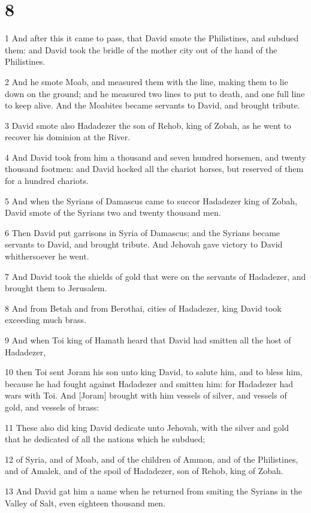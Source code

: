 \chapter{8}

\par 1 And after this it came to pass, that David smote the Philistines, and subdued them: and David took the bridle of the mother city out of the hand of the Philistines.
\par 2 And he smote Moab, and measured them with the line, making them to lie down on the ground; and he measured two lines to put to death, and one full line to keep alive. And the Moabites became servants to David, and brought tribute.
\par 3 David smote also Hadadezer the son of Rehob, king of Zobah, as he went to recover his dominion at the River.
\par 4 And David took from him a thousand and seven hundred horsemen, and twenty thousand footmen: and David hocked all the chariot horses, but reserved of them for a hundred chariots.
\par 5 And when the Syrians of Damascus came to succor Hadadezer king of Zobah, David smote of the Syrians two and twenty thousand men.
\par 6 Then David put garrisons in Syria of Damascus; and the Syrians became servants to David, and brought tribute. And Jehovah gave victory to David whithersoever he went.
\par 7 And David took the shields of gold that were on the servants of Hadadezer, and brought them to Jerusalem.
\par 8 And from Betah and from Berothai, cities of Hadadezer, king David took exceeding much brass.
\par 9 And when Toi king of Hamath heard that David had smitten all the host of Hadadezer,
\par 10 then Toi sent Joram his son unto king David, to salute him, and to bless him, because he had fought against Hadadezer and smitten him: for Hadadezer had wars with Toi. And [Joram] brought with him vessels of silver, and vessels of gold, and vessels of brass:
\par 11 These also did king David dedicate unto Jehovah, with the silver and gold that he dedicated of all the nations which he subdued;
\par 12 of Syria, and of Moab, and of the children of Ammon, and of the Philistines, and of Amalek, and of the spoil of Hadadezer, son of Rehob, king of Zobah.
\par 13 And David gat him a name when he returned from smiting the Syrians in the Valley of Salt, even eighteen thousand men.
